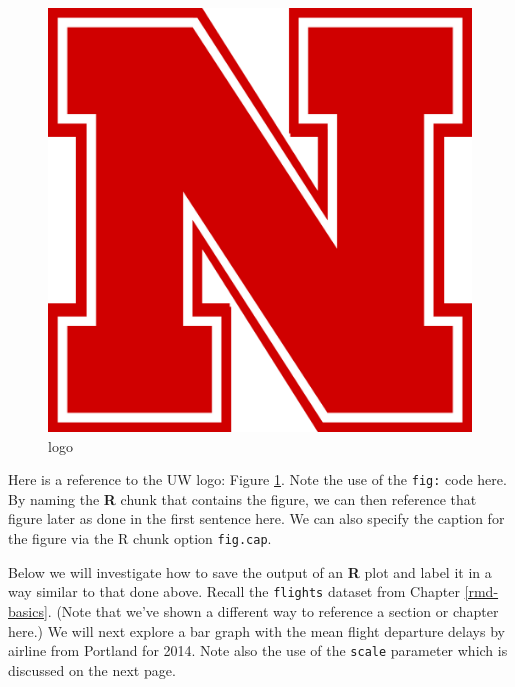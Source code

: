 \documentclass[print]{nuthesis}
\begin{document}
\begin{figure}
\includegraphics[width=\linewidth]{figure/unl} \caption{logo}\label{fig:uwlogo}
\end{figure}

Here is a reference to the UW logo: Figure \ref{fig:uwlogo}. Note the use of the \texttt{fig:} code here. By naming the \textbf{R} chunk that contains the figure, we can then reference that figure later as done in the first sentence here. We can also specify the caption for the figure via the R chunk option \texttt{fig.cap}.

\clearpage

Below we will investigate how to save the output of an \textbf{R} plot and label it in a way similar to that done above. Recall the \texttt{flights} dataset from Chapter \ref{rmd-basics}. (Note that we've shown a different way to reference a section or chapter here.) We will next explore a bar graph with the mean flight departure delays by airline from Portland for 2014. Note also the use of the \texttt{scale} parameter which is discussed on the next page.
\end{document}
